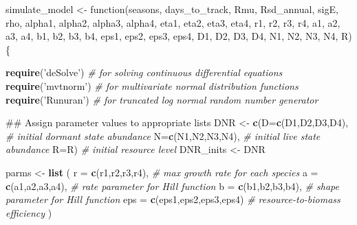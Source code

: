 \documentclass[11pt,]{article}
\newenvironment{Shaded}{\begin{snugshade}}{\end{snugshade}}
\newcommand{\KeywordTok}[1]{\textcolor[rgb]{0.13,0.29,0.53}{\textbf{{#1}}}}
\newcommand{\DataTypeTok}[1]{\textcolor[rgb]{0.13,0.29,0.53}{{#1}}}
\newcommand{\StringTok}[1]{\textcolor[rgb]{0.31,0.60,0.02}{{#1}}}
\newcommand{\CommentTok}[1]{\textcolor[rgb]{0.56,0.35,0.01}{\textit{{#1}}}}
\newcommand{\NormalTok}[1]{{#1}}
\begin{document}
\begin{Shaded}
\begin{Highlighting}[]
\NormalTok{simulate_model <-}\StringTok{ }\NormalTok{function(seasons, days_to_track, Rmu, }
                           \NormalTok{Rsd_annual, sigE, rho, }
                           \NormalTok{alpha1, alpha2, alpha3, alpha4,}
                           \NormalTok{eta1, eta2, eta3, eta4,}
                           \NormalTok{r1, r2, r3, r4,}
                           \NormalTok{a1, a2, a3, a4,}
                           \NormalTok{b1, b2, b3, b4,}
                           \NormalTok{eps1, eps2, eps3, eps4,}
                           \NormalTok{D1, D2, D3, D4,}
                           \NormalTok{N1, N2, N3, N4, R) \{}
  
  \KeywordTok{require}\NormalTok{(}\StringTok{'deSolve'}\NormalTok{) }\CommentTok{# for solving continuous differential equations}
  \KeywordTok{require}\NormalTok{(}\StringTok{'mvtnorm'}\NormalTok{) }\CommentTok{# for multivariate normal distribution functions}
  \KeywordTok{require}\NormalTok{(}\StringTok{'Runuran'}\NormalTok{) }\CommentTok{# for truncated log normal random number generator}
  
  \NormalTok{##  Assign parameter values to appropriate lists}
  \NormalTok{DNR <-}\StringTok{ }\KeywordTok{c}\NormalTok{(}\DataTypeTok{D=}\KeywordTok{c}\NormalTok{(D1,D2,D3,D4),   }\CommentTok{# initial dormant state abundance}
           \DataTypeTok{N=}\KeywordTok{c}\NormalTok{(N1,N2,N3,N4),   }\CommentTok{# initial live state abundance}
           \DataTypeTok{R=}\NormalTok{R)                }\CommentTok{# initial resource level}
  \NormalTok{DNR_inits <-}\StringTok{ }\NormalTok{DNR}
  
  \NormalTok{parms <-}\StringTok{ }\KeywordTok{list} \NormalTok{(}
    \DataTypeTok{r   =} \KeywordTok{c}\NormalTok{(r1,r2,r3,r4),          }\CommentTok{# max growth rate for each species}
    \DataTypeTok{a   =} \KeywordTok{c}\NormalTok{(a1,a2,a3,a4),          }\CommentTok{# rate parameter for Hill function }
    \DataTypeTok{b   =} \KeywordTok{c}\NormalTok{(b1,b2,b3,b4),          }\CommentTok{# shape parameter for Hill function}
    \DataTypeTok{eps =} \KeywordTok{c}\NormalTok{(eps1,eps2,eps3,eps4)   }\CommentTok{# resource-to-biomass efficiency}
  \NormalTok{)}
  

\end{Highlighting}
\end{Shaded}
\end{document}
